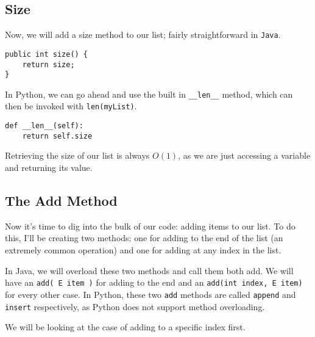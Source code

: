 \subsection{Size}
Now, we will add a size method to our list; fairly straightforward in \texttt{Java}.

\begin{verbatim}
public int size() {  
	return size;
}
\end{verbatim}

In Python, we can go ahead and use the built in \texttt{\_\_len\_\_} method, which can then be invoked with \texttt{len(myList)}.

\begin{verbatim}
def __len__(self):
	return self.size
\end{verbatim}




Retrieving the size of our list is always $O(1)$, as we are just accessing a variable and returning its value.

\subsection{The Add Method}
Now it's time to dig into the bulk of our code: adding items to our list.
To do this, I'll be creating two methods:  one for adding to the end of the list (an extremely common operation) and one for adding at any index in the list.

In Java, we will overload these two methods and call them both add.  We will have an \texttt{add( E item )} for adding to the end and an \texttt{add(int index, E item)} for every other case.  
In Python, these two \texttt{add} methods are called \texttt{append} and \texttt{insert} respectively, as Python does not support method overloading.

We will be looking at the case of adding to a specific index first.


